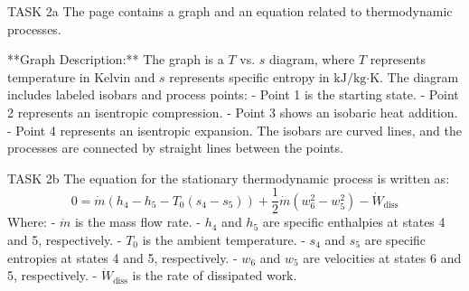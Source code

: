 TASK 2a  
The page contains a graph and an equation related to thermodynamic processes.  

**Graph Description:**  
The graph is a \( T \) vs. \( s \) diagram, where \( T \) represents temperature in Kelvin and \( s \) represents specific entropy in \( \text{kJ/kg·K} \). The diagram includes labeled isobars and process points:  
- Point 1 is the starting state.  
- Point 2 represents an isentropic compression.  
- Point 3 shows an isobaric heat addition.  
- Point 4 represents an isentropic expansion.  
The isobars are curved lines, and the processes are connected by straight lines between the points.  

TASK 2b  
The equation for the stationary thermodynamic process is written as:  
\[
0 = \dot{m} \left( h_4 - h_5 - T_0 (s_4 - s_5) \right) + \frac{1}{2} \dot{m} \left( w_6^2 - w_5^2 \right) - \dot{W}_{\text{diss}}
\]  
Where:  
- \( \dot{m} \) is the mass flow rate.  
- \( h_4 \) and \( h_5 \) are specific enthalpies at states 4 and 5, respectively.  
- \( T_0 \) is the ambient temperature.  
- \( s_4 \) and \( s_5 \) are specific entropies at states 4 and 5, respectively.  
- \( w_6 \) and \( w_5 \) are velocities at states 6 and 5, respectively.  
- \( \dot{W}_{\text{diss}} \) is the rate of dissipated work.  